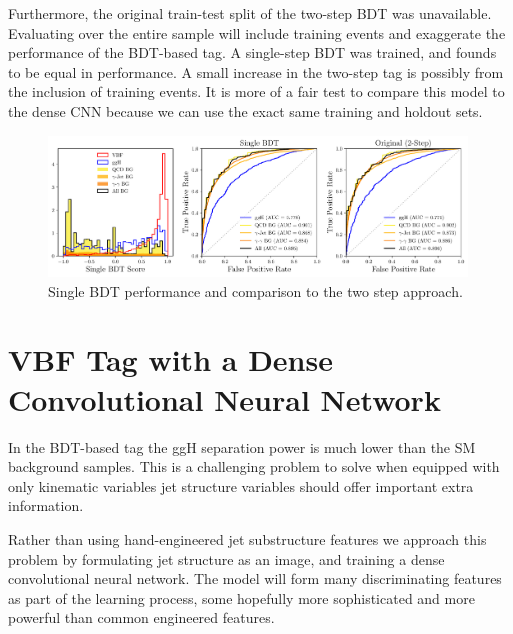 Furthermore, the original train-test split of the two-step BDT was unavailable. Evaluating over the entire sample will include training events and exaggerate the performance of the BDT-based tag. 
A single-step BDT was trained, and founds to be equal in performance. A small increase in the two-step tag is possibly from the inclusion of training events. 
It is more of a fair test to compare this model to the dense CNN because we can use the exact same training and holdout sets. 
\begin{figure}[h!]
    \includegraphics[width=0.99\textwidth]{figures/event_selection/dijet_BDT_PS_unw.pdf}
    \caption{Single BDT performance and comparison to the two step approach.}
    \label{fig:event_categorisation:single_BDT}
\end{figure}

















\section{VBF Tag with a Dense Convolutional Neural Network}
In the BDT-based tag the ggH separation power is much lower than the SM background samples. 
This is a challenging problem to solve when equipped with only kinematic variables jet structure variables should offer important extra information.

Rather than using hand-engineered jet substructure features we approach this problem by formulating jet structure as an image, and training a dense convolutional neural network.
The model will form many discriminating features as part of the learning process, some hopefully more sophisticated  and more powerful than common engineered features. 

